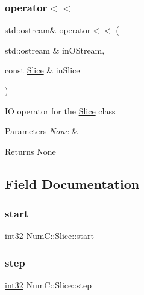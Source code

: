 \subsubsection{\texorpdfstring{operator$<$$<$}{operator<<}}
{\footnotesize\ttfamily std\+::ostream\& operator$<$$<$ (\begin{DoxyParamCaption}\item[{std\+::ostream \&}]{in\+O\+Stream,  }\item[{const \mbox{\hyperlink{class_num_c_1_1_slice}{Slice}} \&}]{in\+Slice }\end{DoxyParamCaption})\hspace{0.3cm}{\ttfamily [friend]}}

IO operator for the \mbox{\hyperlink{class_num_c_1_1_slice}{Slice}} class


\begin{DoxyParams}{Parameters}
{\em None} & \\
\hline
\end{DoxyParams}
\begin{DoxyReturn}{Returns}
None 
\end{DoxyReturn}


\subsection{Field Documentation}
\mbox{\label{class_num_c_1_1_slice_a9be315d782553b06c6af8256ef80e311}} 
\subsubsection{\texorpdfstring{start}{start}}
{\footnotesize\ttfamily \mbox{\hyperlink{namespace_num_c_aa5a7e69266097d55816d4cdb19542b53}{int32}} Num\+C\+::\+Slice\+::start}

\mbox{\label{class_num_c_1_1_slice_a95060e2e1c9a2adbf1f6d0f58d1dd951}} 
\subsubsection{\texorpdfstring{step}{step}}
{\footnotesize\ttfamily \mbox{\hyperlink{namespace_num_c_aa5a7e69266097d55816d4cdb19542b53}{int32}} Num\+C\+::\+Slice\+::step}

